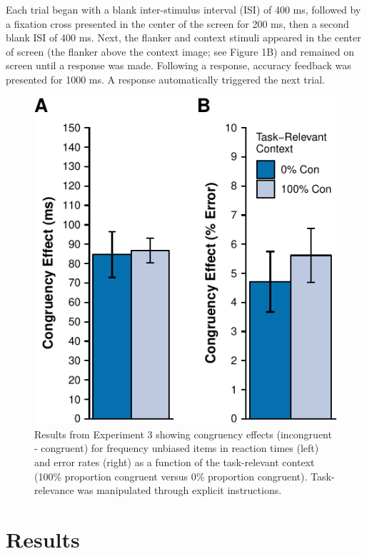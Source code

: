\documentclass[english,,man,floatsintext]{apa6}
\begin{document}
Each trial began with a blank inter-stimulus interval (ISI) of 400 ms, followed by a fixation cross presented in the center of the screen for 200 ms, then a second blank ISI of 400 ms. Next, the flanker and context stimuli appeared in the center of screen (the flanker above the context image; see Figure 1B) and remained on screen until a response was made. Following a response, accuracy feedback was presented for 1000 ms. A response automatically triggered the next trial.

\begin{figure}
\centering
\includegraphics{manuscript_pretty_files/figure-latex/figure4-1.pdf}
\caption{\label{fig:figure4}Results from Experiment 3 showing congruency effects (incongruent - congruent) for frequency unbiased items in reaction times (left) and error rates (right) as a function of the task-relevant context (100\% proportion congruent versus 0\% proportion congruent). Task-relevance was manipulated through explicit instructions.}
\end{figure}



\hypertarget{results-2}{%
\section{Results}\label{results-2}}
\end{document}
